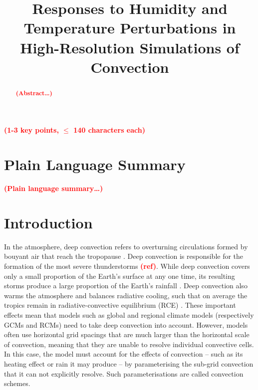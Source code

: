 \documentclass[draft]{agujournal2019}
\newcommand{\todo}[1]{\textcolor{red}{\textbf{(#1)}}}
\begin{document}
\title{Responses to Humidity and Temperature Perturbations in High-Resolution Simulations of Convection}




\begin{keypoints}
\item \todo{1-3 key points, $\leq$ 140 characters each}
\end{keypoints}

\begin{abstract}
\todo{Abstract\ldots}
\end{abstract}

\section*{Plain Language Summary}
\todo{Plain language summary\ldots}

\section{Introduction}

In the atmosphere, deep convection refers to overturning circulations formed by
bouyant air that reach the tropopause \cite{Wallace_2006}. Deep convection is
responsible for the formation of the most severe thunderstorms \todo{ref}. While
deep convection covers only a small proportion of the Earth's surface at any one
time, its resulting storms produce a large proportion of the Earth's rainfall
\cite{Wallace_2006}. Deep convection also warms the atmosphere and balances
radiative cooling, such that on average the tropics remain in
radiative-convective equilibrium (RCE) \cite{Manabe_JAS_1964}. These important
effects mean that models such as global and regional climate models
(respectively GCMs and RCMs) need to take deep convection into account. However,
models often use horizontal grid spacings that are much larger than the
horizontal scale of convection, meaning that they are unable to resolve
individual convective cells. In this case, the model must account for the
effects of convection -- such as its heating effect or rain it may produce -- by
parameterising the sub-grid convection that it can not explicitly resolve. Such
parameterisations are called convection schemes. 
\end{document}
